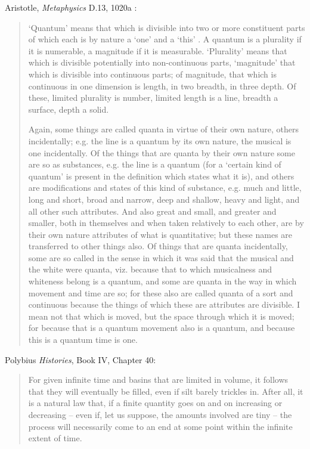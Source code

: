\documentclass{article}
\begin{document}
Aristotle, {\em Metaphysics} D.13, 1020a \cite{metaphysica}:

\begin{quote}
`Quantum' means that which is divisible into two or more constituent parts of which each is by nature a `one'
and a `this' . A quantum is a plurality if it is numerable,
a magnitude if it is measurable. `Plurality' means that which is divisible potentially into non-continuous parts,
`magnitude' that which is divisible into continuous parts; of magnitude, that which is continuous in one dimension is length, in two breadth, in three depth. Of these, limited plurality is number, limited length is a line, breadth a surface, depth a solid.

Again, some things are called quanta in virtue of their
own nature, others incidentally; e.g. the line is a quantum by its own nature, the musical is one incidentally. Of the things that are quanta by their own nature some are so as 
substances, e.g. the line is a quantum (for a `certain kind of quantum' is present in the definition which states what it is), and others are modifications and states of this kind of substance, e.g. much and little, long and short, broad and 
narrow, deep and shallow, heavy and light, and all other such attributes. And also great and small, and greater and smaller, both in themselves and when taken relatively to each other, are by their own nature attributes of what is quantitative; but these names are transferred to other things also. Of things that are quanta incidentally, some are so called in
the sense in which it was said that the musical and the white were quanta, viz. because that to which musicalness and whiteness belong is a quantum, and some are quanta in the way in which movement and time are so; for these also are
called quanta of a sort and continuous because the things of which these are attributes are divisible. I mean not that which is moved, but the space through which it is moved; for because that is a quantum movement also is a quantum, and because this is a quantum time is one.
\end{quote}

Polybius {\em Histories}, Book IV, Chapter 40:

\begin{quote}
For given infinite time and basins that are limited in volume,
it follows that they will eventually be filled, even if silt barely trickles in. After all, it is a natural law that,
if a finite quantity goes on and on increasing or decreasing -- even if, let us suppose, the amounts involved
are tiny -- the process will necessarily come to an end at some point within the infinite extent of time.
\end{quote}
\end{document}
